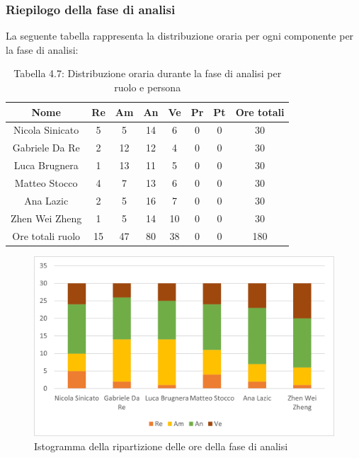 \subsubsection{Riepilogo della fase di analisi}
%
La seguente tabella rappresenta la distribuzione oraria per ogni componente per la fase di analisi:
\begin{table}[h]
	\setlength\extrarowheight{5pt}
	\centering
	\begin{tabularx}{\textwidth}{|ccccccc|c|}
		\hline
		\rowcolor{white}
		\textbf{Nome} & \textbf{Re} & \textbf{Am} & \textbf{An} & \textbf{Ve} & \textbf{Pr}& \textbf{Pt} & \textbf{Ore totali} \\
		\hline
		Nicola Sinicato &5&5&14&6&0&0&30 \\
		Gabriele Da Re &2&12&12&4&0&0&30 \\
		Luca Brugnera &1&13&11&5&0&0&30 \\
		Matteo Stocco &4&7&13&6&0&0&30 \\
		Ana Lazic &2&5&16&7&0&0&30 \\
		Zhen Wei Zheng &1&5&14&10&0&0&30 \\
		\hline
		Ore totali ruolo &15&47&80&38&0&0&180 \\
		\hline
	\end{tabularx}
	\vspace{10pt}
	\caption{Tabella 4.7: Distribuzione oraria durante la fase di analisi per ruolo e persona}
\end{table}
\begin{figure}[H]
    \centering
    \includegraphics[scale=0.6]{img/grafi preventivo/istogrammi/analisi/complessivo.png}
    \caption{Istogramma della ripartizione delle ore della fase di analisi}
\end{figure}
